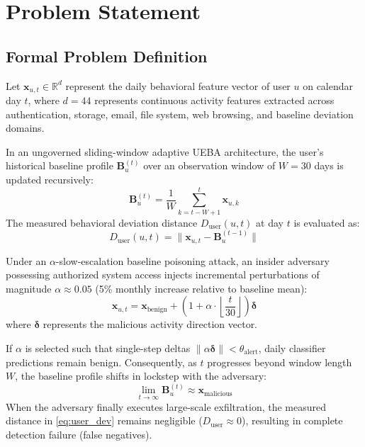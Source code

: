 \documentclass[12pt,a4paper]{report}
\begin{document}
\chapter{Problem Statement}
\label{chap:problem_statement}

\section{Formal Problem Definition}
Let $\mathbf{x}_{u,t} \in \mathbb{R}^d$ represent the daily behavioral feature vector of user $u$ on calendar day $t$, where $d = 44$ represents continuous activity features extracted across authentication, storage, email, file system, web browsing, and baseline deviation domains.

In an ungoverned sliding-window adaptive UEBA architecture, the user's historical baseline profile $\mathbf{B}_u^{(t)}$ over an observation window of $W = 30$ days is updated recursively:
\begin{equation}
    \mathbf{B}_u^{(t)} = \frac{1}{W} \sum_{k=t-W+1}^{t} \mathbf{x}_{u,k}
    \label{eq:baseline_mean}
\end{equation}
The measured behavioral deviation distance $D_{\text{user}}(u, t)$ at day $t$ is evaluated as:
\begin{equation}
    D_{\text{user}}(u, t) = \|\mathbf{x}_{u,t} - \mathbf{B}_u^{(t-1)}\|
    \label{eq:user_dev}
\end{equation}

Under an $\alpha$-slow-escalation baseline poisoning attack, an insider adversary possessing authorized system access injects incremental perturbations of magnitude $\alpha \approx 0.05$ (5\% monthly increase relative to baseline mean):
\begin{equation}
    \mathbf{x}_{u,t} = \mathbf{x}_{\text{benign}} + \left(1 + \alpha \cdot \left\lfloor \frac{t}{30} \right\rfloor \right) \boldsymbol{\delta}
    \label{eq:attack_injection}
\end{equation}
where $\boldsymbol{\delta}$ represents the malicious activity direction vector. 

If $\alpha$ is selected such that single-step deltas $\|\alpha \boldsymbol{\delta}\| < \theta_{\text{alert}}$, daily classifier predictions remain benign. Consequently, as $t$ progresses beyond window length $W$, the baseline profile shifts in lockstep with the adversary:
\begin{equation}
    \lim_{t \to \infty} \mathbf{B}_u^{(t)} \approx \mathbf{x}_{\text{malicious}}
    \label{eq:baseline_limit}
\end{equation}
When the adversary finally executes large-scale exfiltration, the measured distance in \eqref{eq:user_dev} remains negligible ($D_{\text{user}} \approx 0$), resulting in complete detection failure (false negatives).
\end{document}
